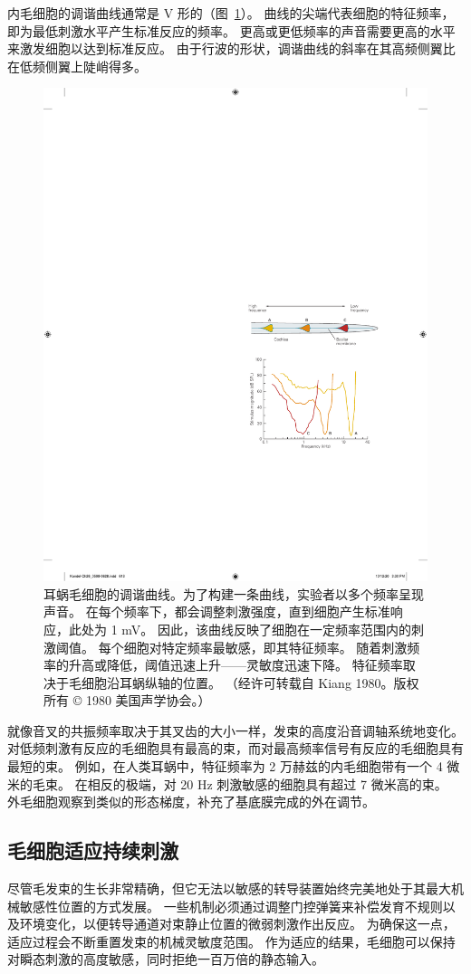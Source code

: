 内毛细胞的调谐曲线通常是 V 形的（图~\ref{fig:26_11}）。
曲线的尖端代表细胞的特征频率，即为最低刺激水平产生标准反应的频率。
更高或更低频率的声音需要更高的水平来激发细胞以达到标准反应。
由于行波的形状，调谐曲线的斜率在其高频侧翼比在低频侧翼上陡峭得多。


\begin{figure}[htbp]
	\centering
	\includegraphics[width=0.5\linewidth]{chap26/fig_26_11}
	\caption{耳蜗毛细胞的调谐曲线。为了构建一条曲线，实验者以多个频率呈现声音。 在每个频率下，都会调整刺激强度，直到细胞产生标准响应，此处为 1 mV。 因此，该曲线反映了细胞在一定频率范围内的刺激阈值。 每个细胞对特定频率最敏感，即其特征频率。 随着刺激频率的升高或降低，阈值迅速上升——灵敏度迅速下降。 特征频率取决于毛细胞沿耳蜗纵轴的位置。 （经许可转载自 Kiang 1980。版权所有 © 1980 美国声学协会。）}
	\label{fig:26_11}
\end{figure}


就像音叉的共振频率取决于其叉齿的大小一样，发束的高度沿音调轴系统地变化。
对低频刺激有反应的毛细胞具有最高的束，而对最高频率信号有反应的毛细胞具有最短的束。
例如，在人类耳蜗中，特征频率为 2 万赫兹的内毛细胞带有一个 4 微米的毛束。
在相反的极端，对 20 Hz 刺激敏感的细胞具有超过 7 微米高的束。
外毛细胞观察到类似的形态梯度，补充了基底膜完成的外在调节。



\subsection{毛细胞适应持续刺激}

尽管毛发束的生长非常精确，但它无法以敏感的转导装置始终完美地处于其最大机械敏感性位置的方式发展。
一些机制必须通过调整门控弹簧来补偿发育不规则以及环境变化，以便转导通道对束静止位置的微弱刺激作出反应。
为确保这一点，适应过程会不断重置发束的机械灵敏度范围。
作为适应的结果，毛细胞可以保持对瞬态刺激的高度敏感，同时拒绝一百万倍的静态输入。


